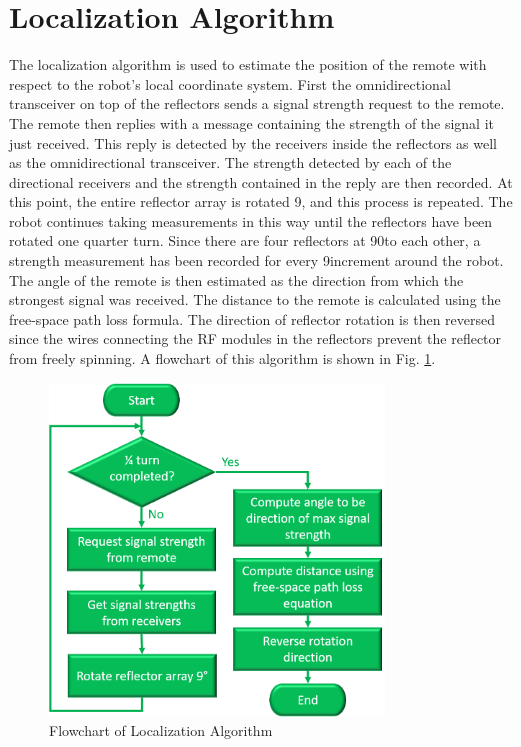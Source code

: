 \section{Localization Algorithm}
The localization algorithm is used to estimate the position of the remote with respect to the robot's local coordinate system. First the omnidirectional transceiver on top of the reflectors sends a signal strength request to the remote. The remote then replies with a message containing the strength of the signal it just received. This reply is detected by the receivers inside the reflectors as well as the omnidirectional transceiver. The strength detected by each of the directional receivers and the strength contained in the reply are then recorded. At this point, the entire reflector array is rotated 9\textdegree, and this process is repeated. The robot continues taking measurements in this way until the reflectors have been rotated one quarter turn. Since there are four reflectors at 90\textdegree to each other, a strength measurement has been recorded for every 9\textdegree increment around the robot. The angle of the remote is then estimated as the direction from which the strongest signal was received. The distance to the remote is calculated using the free-space path loss formula. The direction of reflector rotation is then reversed since the wires connecting the RF modules in the reflectors prevent the reflector from freely spinning. A flowchart of this algorithm is shown in Fig. \ref{fig:localizationAlgoFlowchart}.
\begin{figure}
    \centering
    \includegraphics[width=3.5in]{figs/img/localizationAlgoFlowchart.png}
    \caption{Flowchart of Localization Algorithm}
    \label{fig:localizationAlgoFlowchart}
\end{figure}

